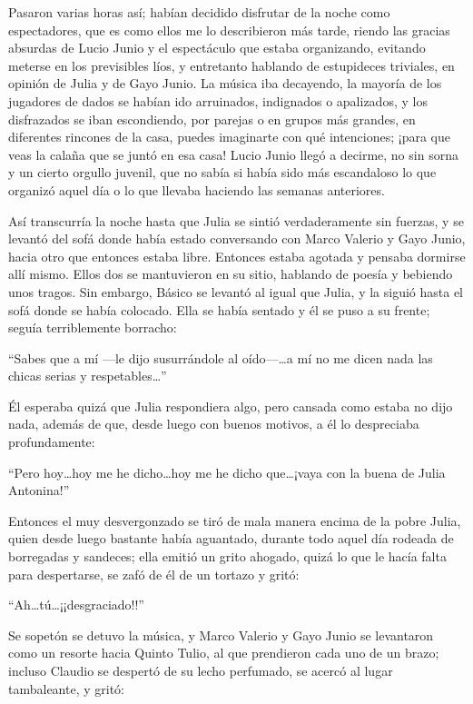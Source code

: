 \documentclass[11pt,openany]{book}
\begin{document}
Pasaron varias horas así; habían decidido disfrutar de la noche como espectadores, que es como ellos me lo describieron más tarde, riendo las gracias absurdas de Lucio Junio y el espectáculo que estaba organizando, evitando meterse en los previsibles líos, y entretanto hablando de estupideces triviales, en opinión de Julia y de Gayo Junio. La música iba decayendo, la mayoría de los jugadores de dados se habían ido arruinados, indignados o apalizados, y los disfrazados se iban escondiendo, por parejas o en grupos más grandes, en diferentes rincones de la casa, puedes imaginarte con qué intenciones; ¡para que veas la calaña que se juntó en esa casa! Lucio Junio llegó a decirme, no sin sorna y un cierto orgullo juvenil, que no sabía si había sido más escandaloso lo que organizó aquel día o lo que llevaba haciendo las semanas anteriores. 

Así transcurría la noche hasta que Julia se sintió verdaderamente sin fuerzas, y se levantó del sofá donde había estado conversando con Marco Valerio y Gayo Junio, hacia otro que entonces estaba libre. Entonces estaba agotada y pensaba dormirse allí mismo. Ellos dos se mantuvieron en su sitio, hablando de poesía y bebiendo unos tragos. Sin embargo, Básico se levantó al igual que Julia, y la siguió hasta el sofá donde se había colocado. Ella se había sentado y él se puso a su frente; seguía terriblemente borracho: 

“Sabes que a mí —le dijo susurrándole al oído—\dots a mí no me dicen nada las chicas serias y respetables\dots” 

Él esperaba quizá que Julia respondiera algo, pero cansada como estaba no dijo nada, además de que, desde luego con buenos motivos, a él lo despreciaba profundamente: 

“Pero hoy\dots hoy me he dicho\dots hoy me he dicho que\dots ¡vaya con la buena de Julia Antonina!” 

Entonces el muy desvergonzado se tiró de mala manera encima de la pobre Julia, quien desde luego bastante había aguantado, durante todo aquel día rodeada de borregadas y sandeces; ella emitió un grito ahogado, quizá lo que le hacía falta para despertarse, se zafó de él de un tortazo y gritó: 

“Ah\dots tú\dots ¡¡desgraciado!!” 

Se sopetón se detuvo la música, y Marco Valerio y Gayo Junio se levantaron como un resorte hacia Quinto Tulio, al que prendieron cada uno de un brazo; incluso Claudio se despertó de su lecho perfumado, se acercó al lugar tambaleante, y gritó: 
\end{document}
